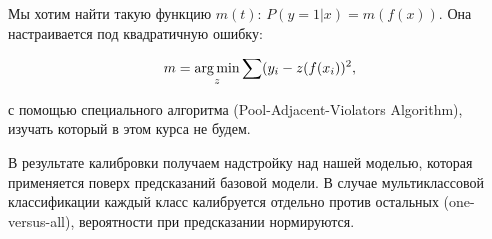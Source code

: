 \documentclass[12pt,a4paper]{article}
\begin{document}
Мы хотим найти такую функцию $m(t)$: $P(y = 1 | x) = m(f(x))$. Она настраивается под квадратичную ошибку:

$$m = \mathop{\rm arg\,min}\limits_{z} \sum (y_i - z(f(x_i))^2,$$

с помощью специального алгоритма (Pool-Adjacent-Violators Algorithm), изучать который в этом курса не будем.

В результате калибровки получаем надстройку над нашей моделью, которая применяется поверх предсказаний базовой модели. В случае мультиклассовой классификации каждый класс калибруется отдельно против остальных (one-versus-all), вероятности при предсказании нормируются.
\end{document}
